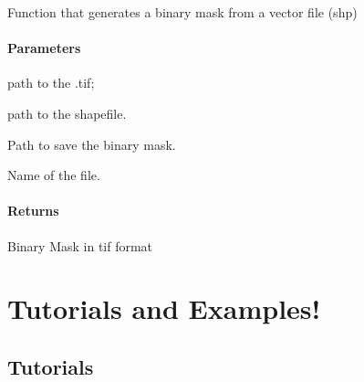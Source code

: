 \documentclass[letterpaper,10pt]{sphinxmanual}
\begin{document}
\begin{fulllineitems}
\label{\detokenize{generated/akhdefo_functions.binary_mask:akhdefo_functions.binary_mask}}
\pysigstartsignatures
{}
\pysigstopsignatures
\sphinxAtStartPar
Function that generates a binary mask from a vector file (shp)


\subsubsection{Parameters}
\label{\detokenize{generated/akhdefo_functions.binary_mask:parameters}}\begin{description}
\sphinxAtStartPar
path to the .tif;

\sphinxAtStartPar
path to the shapefile.

\sphinxAtStartPar
Path to save the binary mask.

\sphinxAtStartPar
Name of the file.

\end{description}


\subsubsection{Returns}
\label{\detokenize{generated/akhdefo_functions.binary_mask:returns}}\begin{description}
\sphinxAtStartPar
Binary Mask in tif format

\end{description}

\end{fulllineitems}



\chapter{Tutorials and Examples!}
\label{\detokenize{index:tutorials-and-examples}}
\sphinxstepscope


\section{Tutorials}
\label{\detokenize{Tutorials:tutorials}}\label{\detokenize{Tutorials::doc}}
\sphinxstepscope
\end{document}
